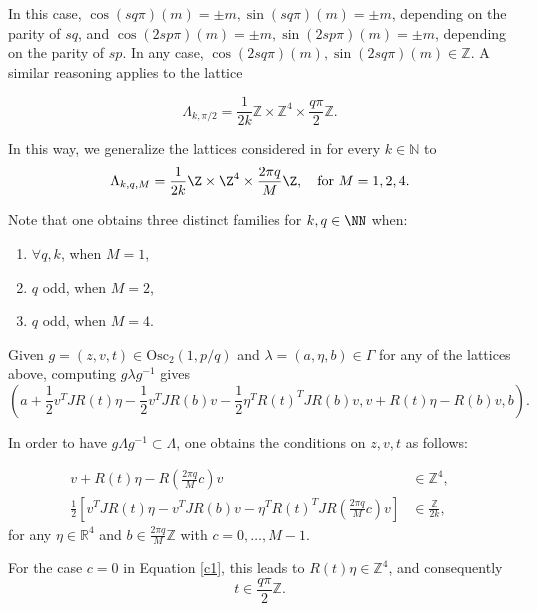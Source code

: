 \documentclass[12pt]{amsart}
\theoremstyle{plain}
\theoremstyle{definition}
\theoremstyle{remark}
\begin{document}
In this case, \( \cos(sq\pi)(m) = \pm m, \sin(sq\pi)(m) = \pm m \), depending on the parity of \( sq \), and \( \cos(2sp\pi)(m) = \pm m, \sin(2sp\pi)(m) = \pm m \), depending on the parity of \( sp \). In any case, \( \cos(2sq\pi)(m), \sin(2sq\pi)(m) \in \mathbb{Z} \). A similar reasoning applies to the lattice

\[
\Lambda_{k,\pi/2} = \frac{1}{2k} \mathbb{Z} \times \mathbb{Z}^4 \times \frac{q\pi}{2}\mathbb{Z}.
\]

In this way, we generalize the lattices considered in \cite{BOV} for every \( k \in \mathbb{N} \) to 
\[
\Lambda_{k,q,M} = \frac{1}{2 k} \Z \times \Z^4 \times \frac{2 \pi q}{M} \Z, \quad \text{for } M = 1,2,4.
\]

Note that one obtains three distinct families for \( k, q \in \NN \) when:
\begin{enumerate}
    \item \( \forall q, k \), when \( M = 1 \),
    \item \( q \) odd, when \( M = 2 \),
    \item \( q \) odd, when \( M = 4 \).
\end{enumerate}

 

Given $g=(z,v,t) \in \text{Osc}_2(1,p/q)$ and $\lambda=(a,\eta,b) \in \Gamma$ for any of the lattices above, computing $g \lambda g^{-1}$ gives
\begin{equation}
    (a + \frac{1}{2}v^T J R(t) \eta - \frac{1}{2} v^T J R(b) v - \frac{1}{2} \eta^T R(t)^T J R(b) v, v + R(t) \eta - R(b) v, b).
\end{equation}

In order to have $g \Lambda g^{-1} \subset \Lambda$, one obtains the conditions on $z,v,t$ as follows:

\begin{align}
    v + R(t) \eta - R\left(\frac{2 \pi q}{M} c\right)v &\in \mathbb{Z}^4,   \label{c1} \\ 
    \frac{1}{2} \left[ v^T J R(t) \eta - v^T J R(b) v - \eta^T R(t)^T J R\left(\frac{2 \pi q}{M} c\right) v \right] &\in \frac{\mathbb{Z}}{2k}, \label{c2}
\end{align}
for any \( \eta \in \mathbb{R}^4 \) and \( b \in \frac{2 \pi q}{M} \mathbb{Z} \) with \( c = 0, \ldots, M-1 \).

For the case \( c = 0 \) in Equation \eqref{c1}, this leads to \( R(t) \eta \in \mathbb{Z}^4 \), and consequently 
\begin{equation}
    t \in \frac{q \pi}{2} \mathbb{Z}. \label{cc1}
\end{equation}
\end{document}
